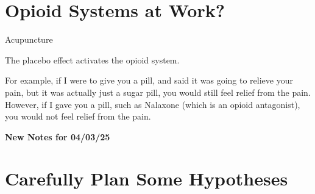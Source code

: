 \section{Opioid Systems at Work?}

\begin{coloredlist}
    \item Acupuncture
    \item The placebo effect activates the opioid system.
    \item For example, if I were to give you a pill, and said it was going to relieve your pain, but it was actually just a sugar pill, you would still feel relief from the pain. However, if I gave you a pill, such as Nalaxone (which is an opioid antagonist), you would not feel relief from the pain. 
\end{coloredlist}

\begin{center}
    \textbf{New Notes for 04/03/25} \\
    \hrulefill
\end{center}

\section{Carefully Plan Some Hypotheses}


